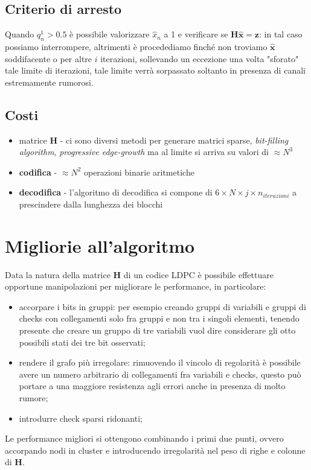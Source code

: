 \documentclass{article}
\begin{document}
	\subsection{Criterio di arresto}
	Quando $q^1_n >0.5$ è possibile valorizzare $\hat{x}_n$ a 1  e verificare se $\textbf{H}\hat{\textbf{x}}=\textbf{z}$: in tal caso possiamo interrompere, altrimenti è procedediamo finché non troviamo $\hat{\textbf{x}}$ soddifacente o per altre $i$ iterazioni, sollevando un eccezione una volta "sforato" tale limite di iterazioni, tale limite verrà sorpassato soltanto in presenza di canali estremamente rumorosi.
	\subsection{Costi}
	\begin{itemize}
		\item matrice \textbf{H} -  ci sono diversi metodi per generare matrici sparse, \textit{bit-filling algorithm}, \textit{progressive edge-growth} ma al limite si arriva su valori di $\approx N^3$
		\item \textbf{codifica} - $\approx N^2$ operazioni binarie aritmetiche
		\item \textbf{decodifica} - l'algoritmo di decodifica si compone di $6 \times N \times j \times n_{iterazioni} $ a prescindere dalla lunghezza dei blocchi
	\end{itemize}
	
	\section{Migliorie all'algoritmo}
	Data la natura della matrice \textbf{H} di un codice LDPC è possibile effettuare opportune manipolazioni per migliorare le performance, in particolare:
	\begin{itemize}
		\item accorpare i bits in gruppi: per esempio creando gruppi di variabili e gruppi di checks con collegamenti solo fra gruppi e non tra i singoli elementi, tenendo presente che creare un gruppo di tre variabili vuol dire considerare gli otto possibili stati dei tre bit osservati;
		\item rendere il grafo più irregolare: rimuovendo il vincolo di regolarità è possibile avere un numero arbitrario di collegamenti fra variabili e checks, questo può portare a una maggiore resistenza agli errori anche in presenza di molto rumore;
		\item introdurre check sparsi ridonanti;
	\end{itemize}
	Le performance migliori si ottengono combinando i primi due punti, ovvero accorpando nodi in cluster e introducendo irregolarità nel peso di righe e colonne di $\textbf{H}$.
\end{document}
